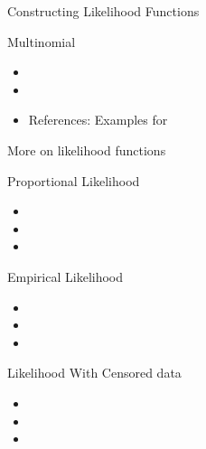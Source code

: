\documentclass{beamer}
\begin{document}
\begin{section}{Constructing Likelihood Functions}
    \begin{frame}{Multinomial}
        \begin{itemize}
            \item
            \item
            \item  References: Examples for 
        \end{itemize}
    \end{frame}
\end{section}


\begin{section}{More on likelihood functions}  

    \begin{frame}{Proportional Likelihood}
        \begin{itemize}
            \item
            \item
            \item 
        \end{itemize}
    \end{frame}

    \begin{frame}{Empirical Likelihood}
        \begin{itemize}
            \item
            \item
            \item  
        \end{itemize}
    \end{frame}

    \begin{frame}{Likelihood With Censored data}
        \begin{itemize}
            \item
            \item
            \item  
        \end{itemize}
    \end{frame}

\end{section}
\end{document}
